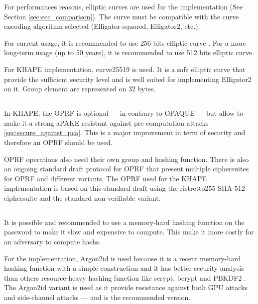 \documentclass[../report.tex]{subfiles}
\begin{document}
For performances reasons, elliptic curves are used for the implementation (See Section \ref{sec:ecc_comparison}).
The curve must be compatible with the curve encoding algorithm selected (Elligator-squared, Elligator2, etc.).


For current usage, it is recommended to use 256 bits elliptic curve \cite{ECRYPT_Keylength}. For a more long-term usage (up to 50 years), it is recommended to use 512 bits elliptic curve.


For KHAPE implementation, curve25519 is used. It is a safe elliptic curve that provide the sufficient security level and is well suited for implementing Elligator2 on it.
Group element are represented on 32 bytes.




\subsection{} \label{sec:design_choice_oprf}
In KHAPE, the OPRF is optional --- in contrary to OPAQUE --- but allow to make it a strong aPAKE resistant against pre-computation attacks \ref{sec:secure_against_pca}.
This is a major improvement in term of security and therefore an OPRF should be used.

OPRF operations also need their own group and hashing function.
There is also an ongoing standard draft protocol for OPRF \cite{VOPRF_Standard_Draft} that present multiple ciphersuites for OPRF and different variants.
The OPRF used for the KHAPE implementation is based on this standard draft using the ristretto255-SHA-512 ciphersuite and the standard non-verifiable variant. %





\subsection{} \label{sec:design_choice_slowhash}
It is possible and recommended to use a memory-hard hashing function on the password to make it slow and expensive to compute. 
This make it more costly for an adversary to compute hashs.

For the implementation, Argon2id \cite{Argon2_Paper} is used because it is a recent memory-hard hashing function with a simple construction and it has better security analysis than others resource-heavy hashing function like scrypt, bcrypt and PBKDF2 \cite{CAA}. The Argon2id variant is used as it provide resistance against both GPU attacks and side-channel attacks --- and is the recommended version.
\end{document}
